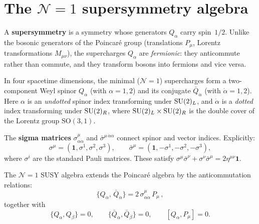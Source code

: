 \documentclass[11pt,a4paper]{article}
\begin{document}
\section{The $\mathcal{N}=1$ supersymmetry algebra}
\label{sec:susy-algebra}

\begin{definition}[Supersymmetry]
\label{def:susy}
A \textbf{supersymmetry} is a symmetry whose generators $Q_\alpha$
carry spin~$1/2$.  Unlike the bosonic generators of the Poincar\'e group
(translations $P_\mu$, Lorentz transformations $M_{\mu\nu}$), the
supercharges $Q_\alpha$ are \emph{fermionic}: they anticommute rather
than commute, and they transform bosons into fermions and vice versa.
\end{definition}

In four spacetime dimensions, the minimal ($\mathcal{N}=1$) supercharges
form a two-component Weyl spinor $Q_\alpha$ (with $\alpha = 1,2$) and
its conjugate $\bar{Q}_{\dot\alpha}$ (with $\dot\alpha = 1,2$).  Here
$\alpha$ is an \emph{undotted} spinor index transforming under
$\mathrm{SU}(2)_L$, and $\dot\alpha$ is a \emph{dotted} index transforming under
$\mathrm{SU}(2)_R$, where $\mathrm{SU}(2)_L \times \mathrm{SU}(2)_R$ is the double cover of the
Lorentz group $\mathrm{SO}(3,1)$.

\begin{definition}
\label{def:sigma}
The \textbf{sigma matrices} $\sigma^\mu_{\alpha\dot\alpha}$ and
$\bar\sigma^{\mu\,\dot\alpha\alpha}$ connect spinor and vector
indices.  Explicitly:
\begin{equation}
  \sigma^\mu = (\mathbf{1}, \sigma^1, \sigma^2, \sigma^3), \qquad
  \bar\sigma^\mu = (\mathbf{1}, -\sigma^1, -\sigma^2, -\sigma^3),
  \label{eq:sigma-def}
\end{equation}
where $\sigma^i$ are the standard Pauli matrices.  These satisfy
$\sigma^\mu \bar\sigma^\nu + \sigma^\nu \bar\sigma^\mu
= 2\eta^{\mu\nu}\mathbf{1}$.
\end{definition}

The $\mathcal{N}=1$ SUSY algebra extends the Poincar\'e algebra by the
anticommutation relations:
\begin{equation}
  \boxed{
    \{Q_\alpha,\, \bar{Q}_{\dot\alpha}\}
    = 2\,\sigma^\mu_{\alpha\dot\alpha}\, P_\mu\,,
  }
  \label{eq:susy-algebra}
\end{equation}
together with
\begin{equation}
  \{Q_\alpha, Q_\beta\} = 0, \qquad
  \{\bar{Q}_{\dot\alpha}, \bar{Q}_{\dot\beta}\} = 0, \qquad
  [Q_\alpha, P_\mu] = 0.
  \label{eq:susy-algebra-rest}
\end{equation}
\end{document}
